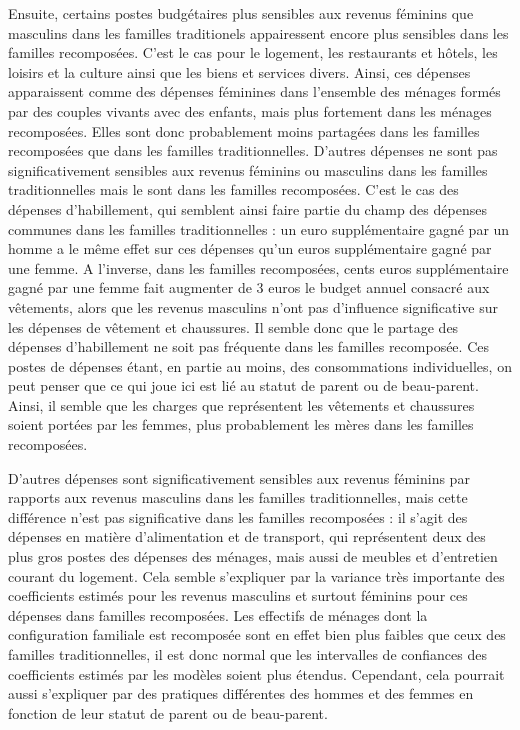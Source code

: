 \documentclass[
  12pt,
]{book}
\begin{document}
Ensuite, certains postes budgétaires plus sensibles aux revenus féminins
que masculins dans les familles traditionels appairessent encore plus
sensibles dans les familles recomposées. C'est le cas pour le logement,
les restaurants et hôtels, les loisirs et la culture ainsi que les biens
et services divers. Ainsi, ces dépenses apparaissent comme des dépenses
féminines dans l'ensemble des ménages formés par des couples vivants
avec des enfants, mais plus fortement dans les ménages recomposées.
Elles sont donc probablement moins partagées dans les familles
recomposées que dans les familles traditionnelles. D'autres dépenses ne
sont pas significativement sensibles aux revenus féminins ou masculins
dans les familles traditionnelles mais le sont dans les familles
recomposées. C'est le cas des dépenses d'habillement, qui semblent ainsi
faire partie du champ des dépenses communes dans les familles
traditionnelles : un euro supplémentaire gagné par un homme a le même
effet sur ces dépenses qu'un euros supplémentaire gagné par une femme. A
l'inverse, dans les familles recomposées, cents euros supplémentaire
gagné par une femme fait augmenter de 3 euros le budget annuel consacré
aux vêtements, alors que les revenus masculins n'ont pas d'influence
significative sur les dépenses de vêtement et chaussures. Il semble donc
que le partage des dépenses d'habillement ne soit pas fréquente dans les
familles recomposée. Ces postes de dépenses étant, en partie au moins,
des consommations individuelles, on peut penser que ce qui joue ici est
lié au statut de parent ou de beau-parent. Ainsi, il semble que les
charges que représentent les vêtements et chaussures soient portées par
les femmes, plus probablement les mères dans les familles recomposées.

D'autres dépenses sont significativement sensibles aux revenus féminins
par rapports aux revenus masculins dans les familles traditionnelles,
mais cette différence n'est pas significative dans les familles
recomposées : il s'agit des dépenses en matière d'alimentation et de
transport, qui représentent deux des plus gros postes des dépenses des
ménages, mais aussi de meubles et d'entretien courant du logement. Cela
semble s'expliquer par la variance très importante des coefficients
estimés pour les revenus masculins et surtout féminins pour ces dépenses
dans familles recomposées. Les effectifs de ménages dont la
configuration familiale est recomposée sont en effet bien plus faibles
que ceux des familles traditionnelles, il est donc normal que les
intervalles de confiances des coefficients estimés par les modèles
soient plus étendus. Cependant, cela pourrait aussi s'expliquer par des
pratiques différentes des hommes et des femmes en fonction de leur
statut de parent ou de beau-parent.
\end{document}
